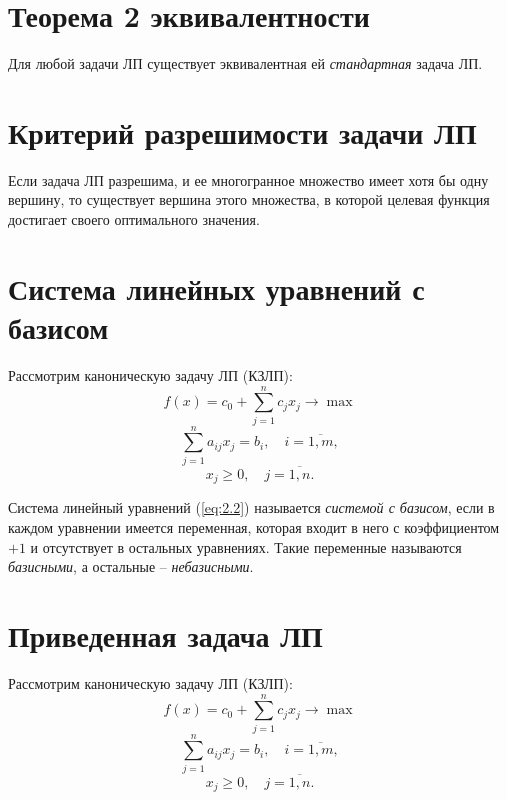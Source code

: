 \section{Теорема 2 эквивалентности}

\begin{theorem}
	Для любой задачи ЛП существует эквивалентная ей \emph{стандартная} задача ЛП.
\end{theorem}

\section{Критерий разрешимости задачи ЛП}

\begin{theorem}
	Если задача ЛП разрешима, и ее многогранное множество имеет хотя бы одну вершину, то существует вершина этого множества, в которой целевая функция достигает своего оптимального значения.
\end{theorem}

\section{Система линейных уравнений с базисом}

Рассмотрим каноническую задачу ЛП (КЗЛП):
\begin{equation}\label{eq:2.1}
	f(x)=c_0 + \sum^{n}_{j=1}c_jx_j\rightarrow \max
\end{equation}
\begin{equation}\label{eq:2.2}
	\sum_{j=1}^{n}a_{ij}x_j=b_i,\quad i=\overline{1,m},
\end{equation}
\begin{equation}\label{eq:2.3}
	x_j \geqslant 0,\quad j = \overline{1,n}.
\end{equation}

\begin{definition}
	Система линейный уравнений (\ref{eq:2.2}) называется \emph{системой с базисом}, если в каждом уравнении имеется переменная, которая входит в него с коэффициентом $ +1 $ и отсутствует в остальных уравнениях. Такие переменные называются \emph{базисными}, а остальные -- \emph{небазисными}.
\end{definition}

\section{Приведенная задача ЛП}

Рассмотрим каноническую задачу ЛП (КЗЛП):
\begin{equation}\label{eq:2.1}
	f(x)=c_0 + \sum^{n}_{j=1}c_jx_j\rightarrow \max
\end{equation}
\begin{equation}\label{eq:2.2}
	\sum_{j=1}^{n}a_{ij}x_j=b_i,\quad i=\overline{1,m},
\end{equation}
\begin{equation}\label{eq:2.3}
	x_j \geqslant 0,\quad j = \overline{1,n}.
\end{equation}


